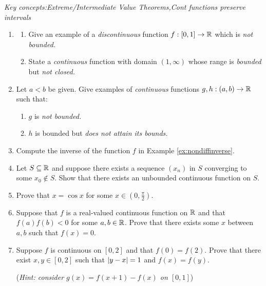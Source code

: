 \begin{exercises}{}{}
	\emph{Key concepts:\quad Extreme/Intermediate Value Theorems,\quad Cont functions preserve intervals}
	
	\begin{enumerate}
		\item\begin{enumerate}
			 \item Give an example of a \emph{discontinuous} function $f:[0,1]\to\mathbb{R}$ which is \emph{not bounded.}
			 \item State a \emph{continuous} function with domain $(1,\infty)$ whose range is \emph{bounded} but \emph{not closed.}
		\end{enumerate}
	  
	  
	  \item Let $a<b$ be given. Give examples of \emph{continuous} functions $g,h:(a,b)\to\mathbb{R}$ such that:
		\begin{enumerate}
			 \item $g$ is \emph{not bounded.}
			 \item $h$ is bounded but \emph{does not attain its bounds.}
		\end{enumerate}
		
	  
	  
	  \item Compute the inverse of the function $f$ in Example \ref{ex:nondiffinverse}.
	  
	  
	  \item%
	  Let $S\subseteq\mathbb{R}$ and suppose there exists a sequence $(x_n)$ in $S$ converging to some $x_0\not\in S$. Show that there exists an unbounded continuous function on $S$.
	  
	  
	  \item%
	  Prove that $x=\cos x$ for some $x\in(0,\tfrac\pi 2)$.
	  
	  
	  \item%
	  Suppose that $f$ is a real-valued continuous function on $\mathbb{R}$ and that $f(a)f(b)<0$ for some $a,b\in\mathbb{R}$. Prove that there exists some $x$ between $a,b$ such that $f(x)=0$.
	  
	  
	  \item%
	  Suppose $f$ is continuous on $[0,2]$ and that $f(0)=f(2)$. Prove that there exist $x,y\in[0,2]$ such that $\left| y-x\right|=1$ and $f(x)=f(y)$.\par
	  (\emph{Hint: consider $g(x)=f(x+1)-f(x)$ on $[0,1]$})
	  

\end{enumerate}
\end{exercises}
